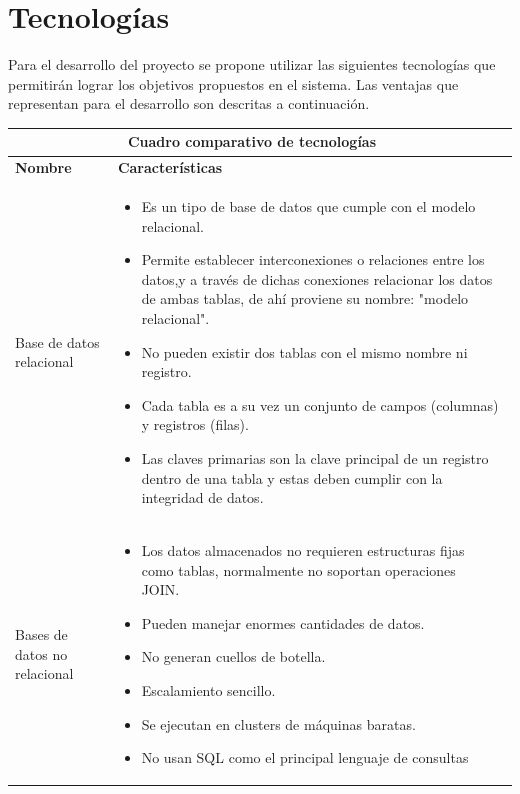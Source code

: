 \section{Tecnologías}
Para el desarrollo del proyecto se propone utilizar las siguientes tecnologías que permitirán lograr los objetivos propuestos en el sistema. Las ventajas que representan para el desarrollo son descritas a continuación.
\vspace{10mm}
	\begin{table}[b!]
    \centering
    \vspace{-30mm}
      \begin{tabular}{|p{2cm}|ll}
        \hline
        
        \multicolumn{2}{|c|}{{\bf Cuadro comparativo de tecnologías}} \\ 
        \hline
          \multicolumn{1}{|p{4cm}|}{{\bf Nombre}} & 
		  \multicolumn{1}{p{10cm}|}{{\bf Características}}\\

        \hline
          \multicolumn{1}{|p{5cm}|}{Base de datos relacional} & 
          \multicolumn{2}{p{10cm}|}{\begin{itemize}
          \vspace{-5mm}
        \item Es un tipo de base de datos que cumple con el modelo relacional.
        \item Permite establecer interconexiones o relaciones entre los datos,y a través de dichas conexiones relacionar los datos de ambas tablas, de ahí proviene su nombre: "modelo relacional".
        \item No pueden existir dos tablas con el mismo nombre ni registro.
        \item Cada tabla es a su vez un conjunto de campos (columnas) y registros (filas).
        \item Las claves primarias son la clave principal de un registro dentro de una tabla y estas deben cumplir con la integridad de datos.
       
      \end{itemize}} \\
         
        \hline
          \multicolumn{1}{|p{5cm}|}{Bases de datos no relacional} & 
          \multicolumn{1}{p{10cm}|}{
          \begin{itemize}
          \vspace{-5mm}
          \item Los datos almacenados no requieren estructuras fijas como tablas, normalmente no soportan operaciones JOIN.
        \item Pueden manejar enormes cantidades de datos.
        \item No generan cuellos de botella.
        \item Escalamiento sencillo.
        \item Se ejecutan en clusters de máquinas baratas.
        \item No usan SQL como el principal lenguaje de consultas
      \end{itemize}} \\ 
       \hline
        

\end{tabular}
\end{table}
